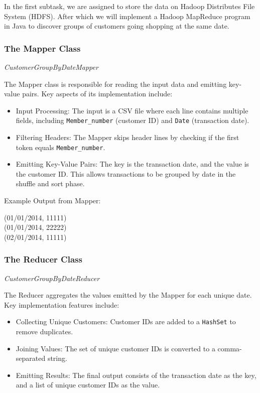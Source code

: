 In the first subtask, we are assigned to store the data on Hadoop Distributes File System (HDFS).
After which we will implement a Hadoop MapReduce program in Java to discover groups of customers going shopping at the same date.

\subsubsection{The Mapper Class} \textit{CustomerGroupByDateMapper}

The Mapper class is responsible for reading the input data and emitting key-value pairs.
Key aspects of its implementation include:

\begin{itemize}
    \item Input Processing: The input is a CSV file where each line contains multiple fields, including \texttt{Member\_number} (customer ID) and \texttt{Date} (transaction date).
    \item Filtering Headers: The Mapper skips header lines by checking if the first token equals \texttt{Member\_number}.
    \item Emitting Key-Value Pairs: The key is the transaction date, and the value is the customer ID.
    This allows transactions to be grouped by date in the shuffle and sort phase.
\end{itemize}

Example Output from Mapper:
\begin{center}
(01/01/2014, 11111)\\
(01/01/2014, 22222)\\
(02/01/2014, 11111)
\end{center}

\subsubsection{The Reducer Class} \textit{CustomerGroupByDateReducer}

The Reducer aggregates the values emitted by the Mapper for each unique date.
Key implementation features include:

\begin{itemize}
    \item Collecting Unique Customers: Customer IDs are added to a \texttt{HashSet} to remove duplicates.
    \item Joining Values: The set of unique customer IDs is converted to a comma-separated string.
    \item Emitting Results: The final output consists of the transaction date as the key, and a list of unique customer IDs as the value.
\end{itemize}

